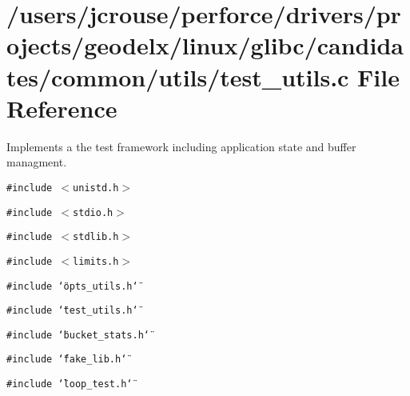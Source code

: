 \section{/users/jcrouse/perforce/drivers/projects/geodelx/linux/glibc/candidates/common/utils/test\_\-utils.c File Reference}
\label{test__utils_8c}
Implements a the test framework including application state and buffer managment. 


{\tt \#include $<$unistd.h$>$}\par
{\tt \#include $<$stdio.h$>$}\par
{\tt \#include $<$stdlib.h$>$}\par
{\tt \#include $<$limits.h$>$}\par
{\tt \#include \char`\"{}opts\_\-utils.h\char`\"{}}\par
{\tt \#include \char`\"{}test\_\-utils.h\char`\"{}}\par
{\tt \#include \char`\"{}bucket\_\-stats.h\char`\"{}}\par
{\tt \#include \char`\"{}fake\_\-lib.h\char`\"{}}\par
{\tt \#include \char`\"{}loop\_\-test.h\char`\"{}}\par
